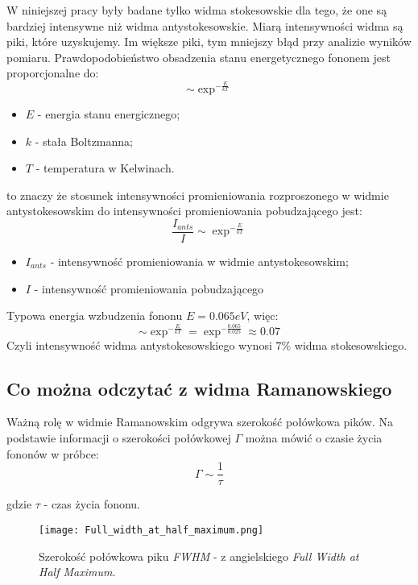 \vspace{1cm}
W niniejszej pracy były badane tylko widma stokesowskie dla tego, że one są bardziej intensywne niż widma antystokesowskie. Miarą intensywności widma są piki, które uzyskujemy. Im większe piki, tym mniejszy błąd przy analizie wyników pomiaru.
Prawdopodobieństwo obsadzenia stanu energetycznego fononem jest proporcjonalne do:
\begin{equation}
	\sim \exp^{-\frac{E}{kT}} 
\end{equation}
\begin{itemize}
	\item{$E$ - energia stanu energicznego};
	\item{$k$ - stała Boltzmanna};
	\item{$T$ - temperatura w Kelwinach}.
\end{itemize}
to znaczy że stosunek intensywności promieniowania rozproszonego w widmie antystokesowskim
do intensywności promieniowania pobudzającego jest:
\begin{equation}
	\frac{I_{ants}}{I} \sim \exp^{-\frac{E}{kT}}
\end{equation}
\begin{itemize}
	\item{$I_{ants}$ - intensywność promieniowania w widmie antystokesowskim};
	\item{$I$ - intensywność promieniowania pobudzającego}
\end{itemize}
	Typowa energia wzbudzenia fononu $E = 0.065eV$, więc:
\begin{equation}
	\sim \exp^{-\frac{E}{kT}} = \exp^{-\frac{0.065}{0.025}} \approx 0.07
\end{equation}
Czyli intensywność widma antystokesowskiego wynosi $7\%$ widma stokesowskiego. 
\subsection{Co można odczytać z widma Ramanowskiego}
Ważną rolę w widmie Ramanowskim odgrywa szerokość połówkowa pików.
Na podstawie informacji o szerokości połówkowej $\Gamma$ można mówić o czasie życia fononów w próbce:
\begin{equation}
	\Gamma \sim \frac{1}{\tau}
\end{equation}

gdzie $\tau$ - czas życia fononu.

\begin{figure}[H]
	\begin{center}
		\texttt{[image: Full\_width\_at\_half\_maximum.png]}
		\caption{Szerokość połówkowa piku \textit{FWHM} - z angielskiego \textit{Full Width at Half Maximum}.}
	\end{center}
\end{figure}

